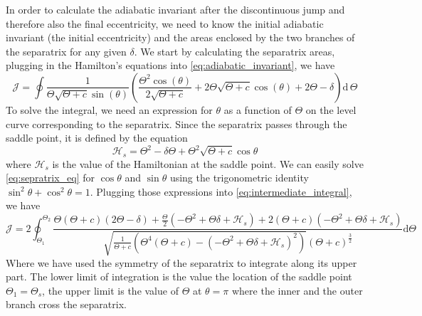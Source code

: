 \documentclass[ twoside,openright,titlepage,numbers=noenddot,headinclude,%
                footinclude=true,cleardoublepage=empty,abstractoff, %
                BCOR=5mm,paper=a4,fontsize=11pt,%
                american,%
                ]{scrreprt}
\begin{document}
In order to calculate the adiabatic invariant after the discontinuous
jump and therefore also the final eccentricity, we need to know
the initial adiabatic invariant (the initial eccentricity) and
the areas enclosed by the two branches of the separatrix for any
given $\delta$. We start by calculating the separatrix areas, 
plugging in the Hamilton's equations into \cref{eq:adiabatic_invariant},
we have
\begin{equation}
    \mathcal{J}=\oint \frac{1}{\Theta \sqrt{\Theta + c} 
    \sin{\left (\theta \right )}} 
    \left(\frac{\Theta^{2} \cos{\left (\theta \right )}}
    {2 \sqrt{\Theta + c}} + 2 \Theta \sqrt{\Theta + c} 
    \cos{\left (\theta \right )} + 2 \Theta - \delta\right)\mathrm{d}\,\Theta
    \label{eq:intermediate_integral}
\end{equation}
To solve the integral, we need an expression for $\theta$ as a
function of $\Theta$ on the level curve corresponding to the separatrix.
Since the separatrix passes through the saddle point, it is defined by
the equation
\begin{equation}
    \mathcal{H}_s=\Theta^2-\delta\Theta+\Theta^2\sqrt{\Theta+c}\cos\theta
    \label{eq:sepratrix_eq}
\end{equation}
where $\mathcal{H}_s$ is the value of the Hamiltonian at the saddle point.
We can easily solve \cref{eq:sepratrix_eq} for $\cos\theta$ and $\sin\theta$
using the trigonometric identity $\sin^2\theta+\cos^2\theta=1$. Plugging
those expressions into \cref{eq:intermediate_integral}, we have
\begin{equation}
    \mathcal{J}=2\oint_{\Theta_1}^{\Theta_2}\frac{\Theta 
    \left(\Theta + c\right) \left(2 \Theta - 
    \delta\right) + \frac{\Theta}{2} \left(- \Theta^{2} + \Theta \delta 
    + \mathcal{H}_s\right) + 2 \left(\Theta + c\right) \left(- \Theta^{2}
    + \Theta \delta + \mathcal{H}_s\right)}{\sqrt{\frac{1}{\Theta + c} 
    \left(\Theta^{4} \left(\Theta + c\right) - \left(- \Theta^{2} +
    \Theta \delta + \mathcal{H}_s\right)^{2}\right)} \left(\Theta + 
    c\right)^{\frac{3}{2}}}\mathrm{d}\Theta
    \label{eq:massive_integral}
\end{equation}
Where we have used the symmetry of the separatrix to integrate along 
its upper part. The lower limit of integration is the value the location of the saddle
point $\Theta_1=\Theta_s$, the upper limit is the value of $\Theta$
at $\theta=\pi$ where the inner and the outer branch cross the separatrix.
\end{document}
